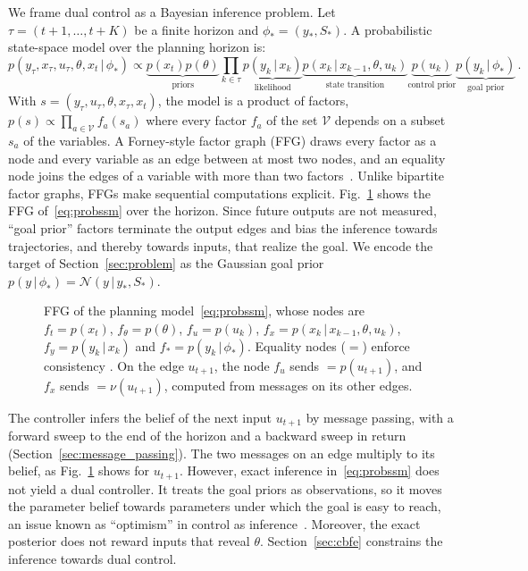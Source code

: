 \documentclass{l4dc2027}
\newcommand*\wcircled[1]{\tikz[baseline=(char.base)]{\node[shape=circle,draw,minimum size=4mm,inner sep=0pt] (char) {#1};}}
\def\cN{\mathcal{N}}
\newcommand\given[1][]{\,#1\vert\,}
\begin{document}
We frame dual control as a Bayesian inference problem.
Let $\tau = (t + 1, \dots, t + K)$ be a finite horizon and $\phi_* = (y_*, S_*)$. A probabilistic state-space model over the planning horizon is:
\begin{equation} \label{eq:probssm}
	p(y_\tau, x_\tau, u_\tau, \theta, x_t \given \phi_*) \propto \underbrace{p(x_t) p(\theta)}_{\text{priors}} \prod_{k \in \tau} \underbrace{p(y_k \given x_k)}_{\text{likelihood}} \underbrace{p(x_{k} \given x_{k-1}, \theta, u_k)}_{\text{state transition}} \underbrace{p(u_k)}_{\text{control prior}} \underbrace{p(y_k \given \phi_*)}_{\text{goal prior}} \, .
\end{equation}
With $s = (y_\tau, u_\tau, \theta, x_\tau, x_t)$, the model is a product of factors, $p(s) \propto \prod_{a \in \mathcal{V}} f_a(s_a)$ where every factor $f_a$ of the set $\mathcal{V}$ depends on a subset $s_a$ of the variables. A Forney-style factor graph (FFG) draws every factor as a node and every variable as an edge between at most two nodes, and an equality node joins the edges of a variable with more than two factors~\citep{loeliger2007factor}. Unlike bipartite factor graphs, FFGs make sequential computations explicit.
Fig.~\ref{fig:ffg} shows the FFG of~\eqref{eq:probssm} over the horizon. Since future outputs are not measured, ``goal prior'' factors terminate the output edges and bias the inference towards trajectories, and thereby towards inputs, that realize the goal. We encode the target of Section~\ref{sec:problem} as the Gaussian goal prior $p(y \given \phi_*) = \cN(y \given y_*, S_*)$.

\begin{figure}[t]
	\centering
	
	\caption{FFG of the planning model~\eqref{eq:probssm}, whose nodes are $f_t = p(x_t)$, $f_\theta = p(\theta)$, $f_u = p(u_k)$, $f_x = p(x_k \given x_{k-1}, \theta, u_k)$, $f_y = p(y_k \given x_k)$ and $f_* = p(y_k \given \phi_*)$. Equality nodes ($=$) enforce consistency \citep{loeliger2007factor}. On the edge $u_{t+1}$, the node $f_u$ sends \protect\wcircled{1}${}= p(u_{t+1})$, and $f_x$ sends \protect\wcircled{2}${}= \nu(u_{t+1})$, computed from messages on its other edges.}
	\label{fig:ffg}
	\vspace{-15pt}
\end{figure}

The controller infers the belief of the next input $u_{t+1}$ by message passing, with a forward sweep to the end of the horizon and a backward sweep in return (Section~\ref{sec:message_passing}). The two messages on an edge multiply to its belief, as Fig.~\ref{fig:ffg} shows for $u_{t+1}$. However, exact inference in~\eqref{eq:probssm} does not yield a dual controller. It treats the goal priors as observations, so it moves the parameter belief towards parameters under which the goal is easy to reach, an issue known as ``optimism'' in control as inference~\citep{levine2018reinforcement}. Moreover, the exact posterior does not reward inputs that reveal $\theta$. Section~\ref{sec:cbfe} constrains the inference towards dual control.
\end{document}
